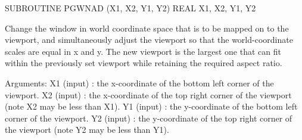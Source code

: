 {\eightpoint\begintt
      SUBROUTINE PGWNAD (X1, X2, Y1, Y2)
      REAL X1, X2, Y1, Y2
 
Change the window in world coordinate space that is to be mapped on
to the viewport, and simultaneously adjust the viewport so that the
world-coordinate scales are equal in x and y. The new viewport is
the largest one that can fit within the previously set viewport
while retaining the required aspect ratio.
 
Arguments:
 X1     (input)  : the x-coordinate of the bottom left corner
                   of the viewport.
 X2     (input)  : the x-coordinate of the top right corner
                   of the viewport (note X2 may be less than X1).
 Y1     (input)  : the y-coordinate of the bottom left corner
                   of the viewport.
 Y2     (input)  : the y-coordinate of the top right corner of the
                   viewport (note Y2 may be less than Y1).
\endtt}
